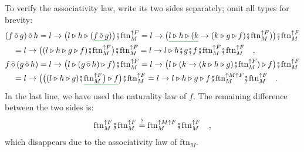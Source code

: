 To verify the associativity law, write its two sides separately; omit
all types for brevity:
\begin{align*}
 & (f\,\tilde{\diamond}\,g)\,\tilde{\diamond}\,h=l\rightarrow\big(l\triangleright h\triangleright(\gunderline{f\,\tilde{\diamond}\,g})\big)\bef\text{ftn}_{M}^{\uparrow F}=l\rightarrow\big(\gunderline{l\triangleright h\triangleright(k}\rightarrow(k\triangleright g\triangleright f)\bef\text{ftn}_{M}^{\uparrow F})\big)\bef\text{ftn}_{M}^{\uparrow F}\\
 & \quad=l\rightarrow\big((l\triangleright h\triangleright g\triangleright f)\bef\text{ftn}_{M}^{\uparrow F}\big)\bef\text{ftn}_{M}^{\uparrow F}=l\rightarrow l\triangleright h\bef g\bef f\bef\text{ftn}_{M}^{\uparrow F}\bef\text{ftn}_{M}^{\uparrow F}\quad,\\
 & f\,\tilde{\diamond}\,(g\,\tilde{\diamond}\,h)=l\rightarrow\big(l\triangleright(g\,\tilde{\diamond}\,h)\triangleright f\big)\bef\text{ftn}_{M}^{\uparrow F}=l\rightarrow\big(l\triangleright(k\rightarrow(k\triangleright h\triangleright g)\bef\text{ftn}_{M}^{\uparrow F})\triangleright f\big)\bef\text{ftn}_{M}^{\uparrow F}\\
 & \quad=l\rightarrow\big(\big((l\triangleright h\triangleright g)\bef\gunderline{\text{ftn}_{M}^{\uparrow F}\big)\triangleright f}\big)\bef\text{ftn}_{M}^{\uparrow F}=l\rightarrow l\triangleright h\triangleright g\triangleright f\bef\text{ftn}_{M}^{\uparrow M\uparrow F}\bef\text{ftn}_{M}^{\uparrow F}\quad.
\end{align*}
In the last line, we have used the naturality law of $f$. The remaining
difference between the two sides is:
\[
\text{ftn}_{M}^{\uparrow F}\bef\text{ftn}_{M}^{\uparrow F}\overset{?}{=}\text{ftn}_{M}^{\uparrow M\uparrow F}\bef\text{ftn}_{M}^{\uparrow F}\quad,
\]
which disappears due to the associativity law of $\text{ftn}_{M}$.

